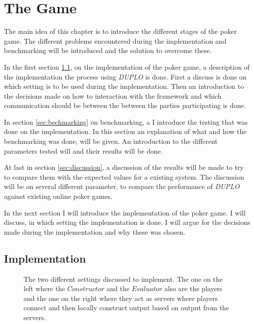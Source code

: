 \documentclass[twoside,11pt,openright]{report}
\newcommand{\DUPLO}{\textit{DUPLO} }
\begin{document}
\chapter{The Game}
\label{ch:implementation}
The main idea of this chapter is to introduce the different stages of the poker game. The different problems encountered during the implementation and benchmarking will be introduced and the solution to overcome these.

In the first section \ref{sec:poker_imp}, on the implementation of the poker game, a description of the implementation the process using \DUPLO is done. First a discuss is done on which setting is to be used during the implementation. Then an introduction to the decisions made on how to interaction with the framework and which communication should be between the between the parties participating is done.

In section \ref{sec:bechmarking} on benchmarking, a I introduce the testing that was done on the implementation. In this section an explanation of what and how the benchmarking was done, will be given. An introduction to the different parameters tested will and their results will be done.

At last in section \ref{sec:discussion}, a discussion of the results will be made to try to compare them with the expected values for a existing system. The discussion will be on several different parameter, to compare the performance of \DUPLO against existing online poker games.

\bigskip

In the next section I will introduce the implementation of the poker game. I will discuss, in which setting the implementation is done. I will argue for the decisions made during the implementation and why these was chosen. 

\section{Implementation}
\label{sec:poker_imp}

\begin{figure}[t]
\centering

\caption{The two different settings discussed to implement. The one on the left where the $Constructor$ and the $Evaluator$ also are the players and the one on the right where they act as servers where players connect and then locally construct output based on output from the servers.}
\label{fig:poker_setting}
\end{figure}
\end{document}
